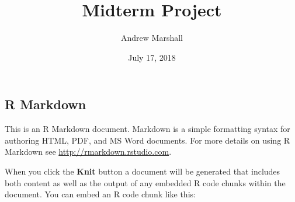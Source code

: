 \documentclass[]{article}
\title{Midterm Project}
\author{Andrew Marshall}
\date{July 17, 2018}
\begin{document}
\maketitle

\subsection{R Markdown}\label{r-markdown}

This is an R Markdown document. Markdown is a simple formatting syntax
for authoring HTML, PDF, and MS Word documents. For more details on
using R Markdown see \url{http://rmarkdown.rstudio.com}.

When you click the \textbf{Knit} button a document will be generated
that includes both content as well as the output of any embedded R code
chunks within the document. You can embed an R code chunk like this:
\end{document}
